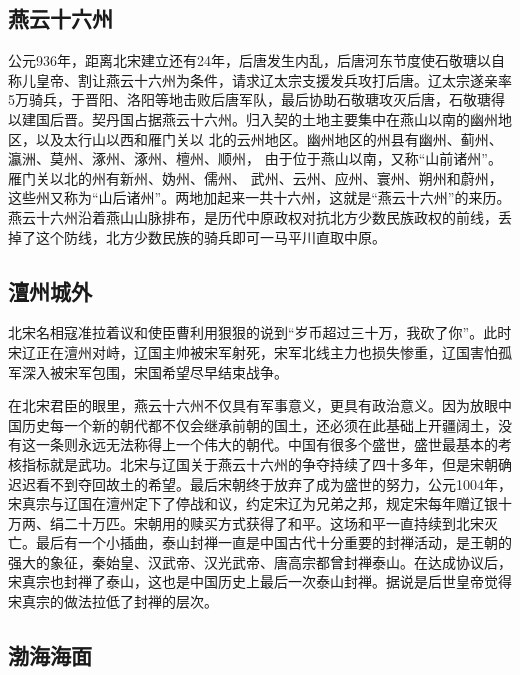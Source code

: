 \documentclass[
]{book}
\begin{document}
\hypertarget{ux71d5ux4e91ux5341ux516dux5dde}{%
\subsection{燕云十六州}\label{ux71d5ux4e91ux5341ux516dux5dde}}

公元936年，距离北宋建立还有24年，后唐发生内乱，后唐河东节度使石敬瑭以自称儿皇帝、割让燕云十六州为条件，请求辽太宗支援发兵攻打后唐。辽太宗遂亲率5万骑兵，于晋阳、洛阳等地击败后唐军队，最后协助石敬瑭攻灭后唐，石敬瑭得以建国后晋。契丹国占据燕云十六州。归入契的土地主要集中在燕山以南的幽州地区，以及太行山以西和雁门关以 北的云州地区。幽州地区的州县有幽州、蓟州、瀛洲、莫州、涿州、涿州、檀州、顺州， 由于位于燕山以南，又称``山前诸州''。雁门关以北的州有新州、妫州、儒州、 武州、云州、应州、寰州、朔州和蔚州， 这些州又称为``山后诸州''。两地加起来一共十六州，这就是``燕云十六州''的来历。燕云十六州沿着燕山山脉排布，是历代中原政权对抗北方少数民族政权的前线，丢掉了这个防线，北方少数民族的骑兵即可一马平川直取中原。

\hypertarget{ux6fb6ux5ddeux57ceux5916}{%
\subsection{澶州城外}\label{ux6fb6ux5ddeux57ceux5916}}

北宋名相寇准拉着议和使臣曹利用狠狠的说到``岁币超过三十万，我砍了你''。此时宋辽正在澶州对峙，辽国主帅被宋军射死，宋军北线主力也损失惨重，辽国害怕孤军深入被宋军包围，宋国希望尽早结束战争。

在北宋君臣的眼里，燕云十六州不仅具有军事意义，更具有政治意义。因为放眼中国历史每一个新的朝代都不仅会继承前朝的国土，还必须在此基础上开疆阔土，没有这一条则永远无法称得上一个伟大的朝代。中国有很多个盛世，盛世最基本的考核指标就是武功。北宋与辽国关于燕云十六州的争夺持续了四十多年，但是宋朝确迟迟看不到夺回故土的希望。最后宋朝终于放弃了成为盛世的努力，公元1004年，宋真宗与辽国在澶州定下了停战和议，约定宋辽为兄弟之邦，规定宋每年赠辽银十万两、绢二十万匹。宋朝用的赎买方式获得了和平。这场和平一直持续到北宋灭亡。最后有一个小插曲，泰山封禅一直是中国古代十分重要的封禅活动，是王朝的强大的象征，秦始皇、汉武帝、汉光武帝、唐高宗都曾封禅泰山。在达成协议后，宋真宗也封禅了泰山，这也是中国历史上最后一次泰山封禅。据说是后世皇帝觉得宋真宗的做法拉低了封禅的层次。

\hypertarget{ux6e24ux6d77ux6d77ux9762}{%
\subsection{渤海海面}\label{ux6e24ux6d77ux6d77ux9762}}
\end{document}

